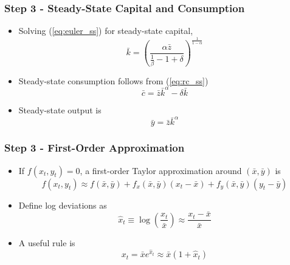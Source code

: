 \documentclass{beamer}
\begin{document}
\begin{frame}
\frametitle{Step 3 - Steady-State Capital and Consumption}

\begin{itemize}
\item Solving (\ref{eq:euler_ss}) for steady-state capital,
\begin{equation}
\bar k =
\left(
\frac{\alpha \bar z}{\frac{1}{\beta}-1+\delta}
\right)^{\frac{1}{1-\alpha}}
\label{eq:ss_k_slide}
\end{equation}
\item Steady-state consumption follows from (\ref{eq:rc_ss})
\begin{equation}
\bar c = \bar z \bar k^\alpha - \delta \bar k
\label{eq:ss_c_slide}
\end{equation}
\item Steady-state output is
\begin{equation}
\bar y = \bar z \bar k^\alpha
\label{eq:ss_y_slide}
\end{equation}
\end{itemize}

\end{frame}

\begin{frame}
\frametitle{Step 3 - First-Order Approximation}

\begin{itemize}
\item If $f(x_t,y_t)=0$, a first-order Taylor approximation around $(\bar x,\bar y)$ is
\begin{equation*}
f(x_t,y_t)
\approx
f(\bar x,\bar y)
+ f_x(\bar x,\bar y)(x_t-\bar x)
+ f_y(\bar x,\bar y)(y_t-\bar y)
\end{equation*}
\item Define log deviations as
\begin{equation*}
\hat x_t \equiv \log\left(\frac{x_t}{\bar x}\right)
\approx \frac{x_t-\bar x}{\bar x}
\end{equation*}
\item A useful rule is
\begin{equation*}
x_t = \bar x e^{\hat x_t} \approx \bar x(1+\hat x_t)
\end{equation*}
\end{itemize}

\end{frame}
\end{document}
